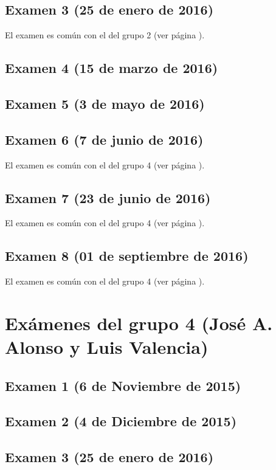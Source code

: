 \documentclass[a4paper,12pt,twoside]{book}
\begin{document}
\subsection{Examen 3 (25 de enero de 2016)}
El examen es común con el del grupo 2 (ver página \pageref{examen_15_16_2_3}).
\subsection{Examen 4 (15 de marzo de 2016)}
\subsection{Examen 5 (3 de mayo de 2016)}
\subsection{Examen 6 (7 de junio de 2016)} 
El examen es común con el del grupo 4 (ver página \pageref{examen_15_16_4_6}).
\subsection{Examen 7 (23 de junio de 2016)}
El examen es común con el del grupo 4 (ver página \pageref{examen_15_16_4_7}).
\subsection{Examen 8 (01 de septiembre de 2016)}
El examen es común con el del grupo 4 (ver página \pageref{examen_15_16_4_8}).

\section{Exámenes del grupo 4 (José A. Alonso y Luis Valencia)}
\subsection{Examen 1 (6 de Noviembre de 2015)}
\subsection{Examen 2 (4 de Diciembre de 2015)}
\subsection{Examen 3 (25 de enero de 2016)}
 \label{examen_15_16_4_3}
\end{document}
